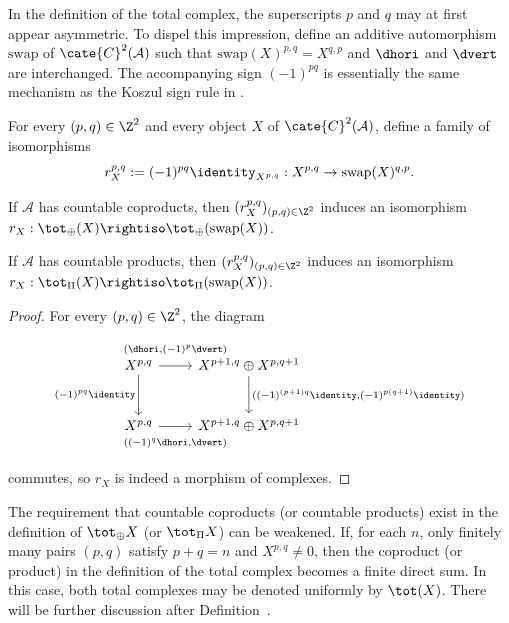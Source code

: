 In the definition of the total complex, the superscripts $p$ and $q$ may at
first appear asymmetric. To dispel this impression, define an additive
automorphism $\mathrm{swap}$ of $\cate{C}^2(\mathcal{A})$ such that
$\mathrm{swap}(X)^{p,q}=X^{q,p}$ and $\dhori$ and $\dvert$ are interchanged.
The accompanying sign $(-1)^{pq}$ is essentially the same mechanism as the
Koszul sign rule in \cite[Definition--Theorem~7.4.4]{Li1}.

\begin{proposition}\label{prop:double-cplx-swap}
	For every $(p,q)\in\Z^2$ and every object $X$ of
	$\cate{C}^2(\mathcal{A})$, define a family of isomorphisms
	\[ r^{p, q}_X := (-1)^{pq} \identity_{X^{p,q}} : X^{p, q} \to \mathrm{swap}(X)^{q,p} . \]
	\begin{compactitem}
		\item If $\mathcal{A}$ has countable coproducts, then
		$(r_X^{p,q})_{(p,q)\in\Z^2}$ induces an isomorphism
		$r_X:\tot_{\oplus}(X)\rightiso\tot_{\oplus}(\mathrm{swap}(X))$.
		\item If $\mathcal{A}$ has countable products, then
		$(r_X^{p,q})_{(p,q)\in\Z^2}$ induces an isomorphism
		$r_X:\tot_{\Pi}(X)\rightiso\tot_{\Pi}(\mathrm{swap}(X))$.
	\end{compactitem}
\end{proposition}
\begin{proof}
	For every $(p,q)\in\Z^2$, the diagram
	\[\begin{tikzcd}[row sep=large]
		X^{p,q} \arrow[d, "(-1)^{pq} \identity"'] \arrow[r, "{ (\dhori, (-1)^p \dvert) }" inner sep=0.8em] & X^{p+1, q} \oplus X^{p, q+1} \arrow[d, "{((-1)^{(p+1)q} \identity, (-1)^{p(q+1)} \identity) }"] \\
		X^{p,q} \arrow[r, "{((-1)^q \dhori, \dvert)}"' inner sep=0.8em] & X^{p+1, q} \oplus X^{p, q+1}
	\end{tikzcd}\]
	commutes, so $r_X$ is indeed a morphism of complexes.
\end{proof}

The requirement that countable coproducts (or countable products) exist in
the definition of $\tot_{\oplus}X$ (or $\tot_{\Pi}X$) can be weakened. If,
for each $n$, only finitely many pairs $(p,q)$ satisfy $p+q=n$ and
$X^{p,q}\neq0$, then the coproduct (or product) in the definition of the
total complex becomes a finite direct sum. In this case, both total complexes
may be denoted uniformly by $\tot(X)$. There will be further discussion after
Definition~.

